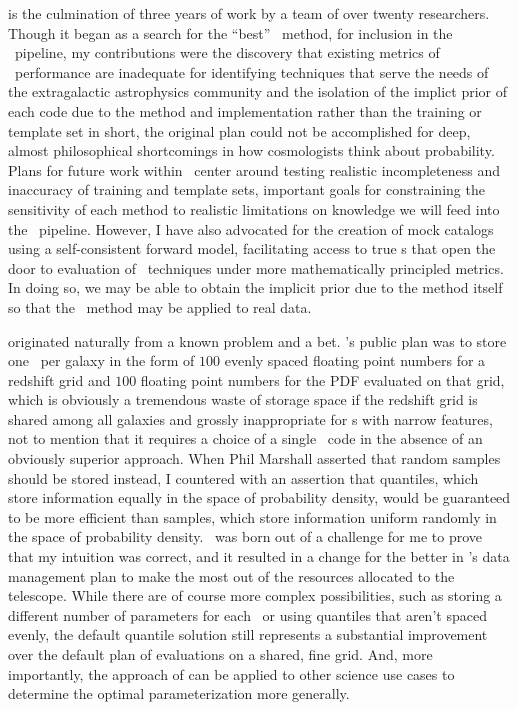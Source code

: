  is the culmination of three years of work by a team of over twenty researchers.
Though it began as a search for the ``best'' \pzpdf\ method, for inclusion in the \lsst\ pipeline, my contributions were the discovery that existing metrics of \pzpdf\ performance are inadequate for identifying techniques that serve the needs of the extragalactic astrophysics community and the isolation of the implict prior of each code due to the method and implementation rather than the training or template set \textemdash in short, the original plan could not be accomplished for deep, almost philosophical shortcomings in how cosmologists think about probability.
Plans for future work within \desc\ center around testing realistic incompleteness and inaccuracy of training and template sets, important goals for constraining the sensitivity of each method to realistic limitations on knowledge we will feed into the \desc\ pipeline.
However, I have also advocated for the creation of mock catalogs using a self-consistent forward model, facilitating access to true \pzpdf s that open the door to evaluation of \pzpdf\ techniques under more mathematically principled metrics.
In doing so, we may be able to obtain the implicit prior due to the method itself so that the \Chippr\ method may be applied to real data.

 originated naturally from a known problem and a bet.
\lsst's public plan was to store one \pzpdf\ per galaxy in the form of $100$ evenly spaced floating point numbers for a redshift grid and $100$ floating point numbers for the PDF evaluated on that grid, which is obviously a tremendous waste of storage space if the redshift grid is shared among all galaxies and grossly inappropriate for \pzpdf s with narrow features, not to mention that it requires a choice of a single \pzpdf\ code in the absence of an obviously superior approach.
When Phil Marshall asserted that random samples should be stored instead, I countered with an assertion that quantiles, which store information equally in the space of probability density, would be guaranteed to be more efficient than samples, which store information uniform randomly in the space of probability density.
\qp\ was born out of a challenge for me to prove that my intuition was correct, and it resulted in a change for the better in \lsst's data management plan to make the most out of the resources allocated to the telescope.
While there are of course more complex possibilities, such as storing a different number of parameters for each \pzpdf\ or using quantiles that aren't spaced evenly, the default quantile solution still represents a substantial improvement over the default plan of evaluations on a shared, fine grid.
And, more importantly, the approach of  can be applied to other science use cases to determine the optimal parameterization more generally.

